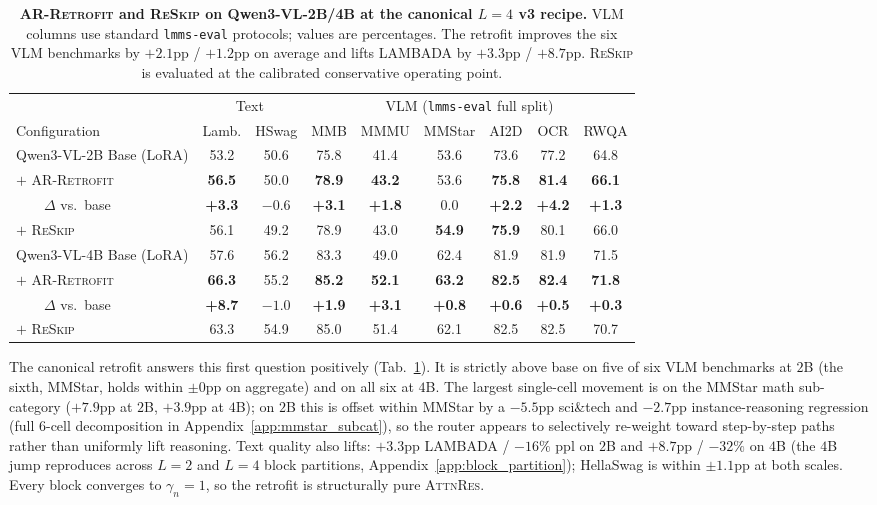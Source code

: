 \documentclass{article}
\newcommand{\attnres}{\textsc{AttnRes}}
\newcommand{\reskip}{\textsc{ReSkip}}
\newcommand{\retrofit}{\textsc{AR-Retrofit}}
\begin{document}
\begin{table}[t]
\caption{\textbf{\retrofit{} and \reskip{} on Qwen3-VL-2B/4B at the canonical $L{=}4$ v3 recipe.} VLM columns use standard \texttt{lmms-eval} protocols; values are percentages. The retrofit improves the six VLM benchmarks by $+2.1$pp / $+1.2$pp on average and lifts LAMBADA by $+3.3$pp / $+8.7$pp. \reskip{} is evaluated at the calibrated conservative operating point.}
\label{tab:retrofit_main}
\centering\small
\setlength{\tabcolsep}{4pt}
\begin{tabular}{lcccccccc}
\toprule
& \multicolumn{2}{c}{Text} & \multicolumn{6}{c}{VLM (\texttt{lmms-eval} full split)} \\
\cmidrule(lr){2-3}\cmidrule(lr){4-9}
Configuration & Lamb. & HSwag & MMB & MMMU & MMStar & AI2D & OCR & RWQA \\
\midrule
Qwen3-VL-2B Base (LoRA)               & 53.2 & 50.6 & 75.8 & 41.4 & 53.6 & 73.6 & 77.2 & 64.8 \\
$+$ \retrofit{}                       & \textbf{56.5} & 50.0 & \textbf{78.9} & \textbf{43.2} & 53.6 & \textbf{75.8} & \textbf{81.4} & \textbf{66.1} \\
~~~~$\Delta$ vs.\ base                & \textbf{+3.3} & $-0.6$ & \textbf{+3.1} & \textbf{+1.8} & $0.0$ & \textbf{+2.2} & \textbf{+4.2} & \textbf{+1.3} \\
$+$ \reskip{}                         & 56.1 & 49.2 & 78.9 & 43.0 & \textbf{54.9} & \textbf{75.9} & 80.1 & 66.0 \\
\midrule
Qwen3-VL-4B Base (LoRA)               & 57.6 & 56.2 & 83.3 & 49.0 & 62.4 & 81.9 & 81.9 & 71.5 \\
$+$ \retrofit{}                       & \textbf{66.3} & 55.2 & \textbf{85.2} & \textbf{52.1} & \textbf{63.2} & \textbf{82.5} & \textbf{82.4} & \textbf{71.8} \\
~~~~$\Delta$ vs.\ base                & \textbf{+8.7} & $-1.0$ & \textbf{+1.9} & \textbf{+3.1} & \textbf{+0.8} & \textbf{+0.6} & \textbf{+0.5} & \textbf{+0.3} \\
$+$ \reskip{}                         & 63.3 & 54.9 & 85.0 & 51.4 & 62.1 & 82.5 & 82.5 & 70.7 \\
\bottomrule
\end{tabular}
\end{table}


The canonical retrofit answers this first question positively (Tab.~\ref{tab:retrofit_main}). It is strictly above base on five of six VLM benchmarks at $2$B (the sixth, MMStar, holds within $\pm 0$pp on aggregate) and on all six at $4$B. The largest single-cell movement is on the MMStar math sub-category ($+7.9$pp at $2$B, $+3.9$pp at $4$B); on $2$B this is offset within MMStar by a $-5.5$pp sci\&tech and $-2.7$pp instance-reasoning regression (full $6$-cell decomposition in Appendix~\ref{app:mmstar_subcat}), so the router appears to selectively re-weight toward step-by-step paths rather than uniformly lift reasoning. Text quality also lifts: $+3.3$pp LAMBADA / $-16\%$ ppl on $2$B and $+8.7$pp / $-32\%$ on $4$B (the $4$B jump reproduces across $L{=}2$ and $L{=}4$ block partitions, Appendix~\ref{app:block_partition}); HellaSwag is within $\pm 1.1$pp at both scales. Every block converges to $\gamma_n{=}1$, so the retrofit is structurally pure \attnres{}.
\end{document}

